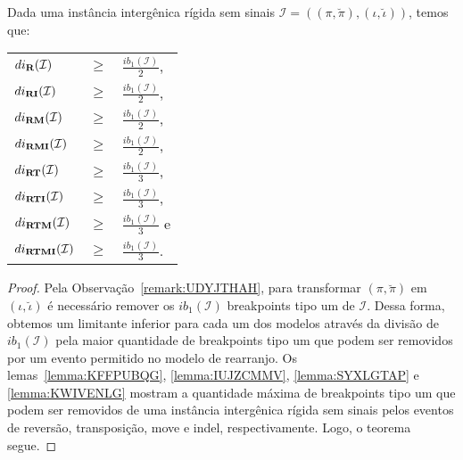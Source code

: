 \begin{theorem}\label{theorem:MPFPKHQO}
Dada uma instância intergênica rígida sem sinais $\mathcal{I} = ((\pi,\breve\pi),(\iota,\breve\iota))$, temos que:

\begin{tabular}{lll}
  $di_{\textbf{R}}(\mathcal{I})$      & $ \ge $ & $\frac{ib_1(\mathcal{I})}{2}$,  \\ 
  $di_{\textbf{RI}}(\mathcal{I})$     & $ \ge $ & $\frac{ib_1(\mathcal{I})}{2}$,  \\
  $di_{\textbf{RM}}(\mathcal{I})$     & $ \ge $ & $\frac{ib_1(\mathcal{I})}{2}$,  \\
  $di_{\textbf{RMI}}(\mathcal{I})$    & $ \ge $ & $\frac{ib_1(\mathcal{I})}{2}$,  \\
  $di_{\textbf{RT}}(\mathcal{I})$     & $ \ge $ & $\frac{ib_1(\mathcal{I})}{3}$,  \\
  $di_{\textbf{RTI}}(\mathcal{I})$    & $ \ge $ & $\frac{ib_1(\mathcal{I})}{3}$,  \\
  $di_{\textbf{RTM}}(\mathcal{I})$    & $ \ge $ & $\frac{ib_1(\mathcal{I})}{3}$ e \\
  $di_{\textbf{RTMI}}(\mathcal{I})$ & $ \ge $ & $\frac{ib_1(\mathcal{I})}{3}$.    \\
\end{tabular}
\end{theorem}
\begin{proof}
Pela Observação~\ref{remark:UDYJTHAH}, para transformar $(\pi,\breve\pi)$ em $(\iota,\breve\iota)$ é necessário remover os $ib_1(\mathcal{I})$ breakpoints tipo um de $\mathcal{I}$. Dessa forma, obtemos um limitante inferior para cada um dos modelos através da divisão de $ib_1(\mathcal{I})$ pela maior quantidade de breakpoints tipo um que podem ser removidos por um evento permitido no modelo de rearranjo. Os lemas~\ref{lemma:KFFPUBQG}, \ref{lemma:IUJZCMMV}, \ref{lemma:SYXLGTAP} e \ref{lemma:KWIVENLG} mostram a quantidade máxima de breakpoints tipo um que podem ser removidos de uma instância intergênica rígida sem sinais pelos eventos de reversão, transposição, move e indel, respectivamente. Logo, o teorema segue.
\end{proof}

